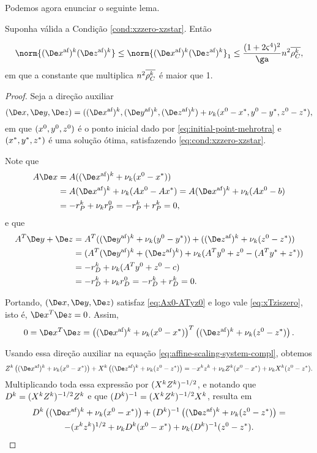 Podemos agora enunciar o seguinte lema.
\begin{lema}\label{lemma:boundDxDzaff}
Suponha válida a Condição  \ref{cond:xzzero-xzstar}. Então 

\begin{equation}
	\label{eq:normDxDzaff}
			\norm{ \dekx  \dekz  } \leq \norm{ \dekx  \dekz  }_{1}  \leq  \frac{(1 + 2\bdxzstar^{4})^{2} }{\ga} n^{2}\rhoCkb,
\end{equation}
em que a constante que multiplica $n^{2}\overline{\rho_C^{k}} $ é maior que \num{1}.
\end{lema}
\begin{proof}
	Seja a direção  auxiliar
	\[
		(\Dex,\Dey,\Dez)  = ( \dekx,  \deky  ,  \dekz  ) + \nuk (\xzero - \xstar,\yzero - \ystar,\zzero - \zstar), 
	\]
em que $(x^0,y^0,z^0)$ é o ponto inicial dado por \eqref{eq:initial-point-mehrotra} e  $(x^*,y^*,z^*)$ é uma  solução ótima, satisfazendo \eqref{eq:cond:xzzero-xzstar}.
	
	Note que 
\[
\begin{aligned}
A\Dex & = A( \dekx + \nuk (\xzero - \xstar)) \\
& =  A\dekx + \nuk (A\xzero - A\xstar)  =  A\dekx + \nuk (A\xzero - b)\\
& = -r_{P}^{k}  + \nuk  r_{P}^{0}   = -r_{P}^{k} + r_{P}^{k} = 0,  
\end{aligned}
\]
e que
\[
\begin{aligned}
A^{T}\Dey + \Dez  & = 	A^{T}(\deky + \nuk (\yzero - \ystar)) + (\dekz + \nuk (\zzero - \zstar)) \\
							& = 	(A^{T}\deky  + \dekz) + \nuk (A^{T}\yzero  + \zzero  - (A^{T}\ystar +  \zstar)) \\
							& = 	- r_{D}^{k} + \nuk (A^{T}\yzero  + \zzero  - c) \\
							& = - r_{D}^{k}  + \nuk  r_{D}^{0}   = -r_{D}^{k} + r_{D}^{k} = 0.   
\end{aligned}
\]


Portando, $(\Dex,\Dey,\Dez)$  satisfaz \eqref{eq:Ax0-ATyz0} e logo vale \eqref{eq:xTziszero}, isto é, $\Dex^{T}\Dez = 0$. Assim, 
	\begin{equation}
		\label{eq:DxDzaff1}
			 0 = \Dex^{T}\Dez = \left( \dekx +  \nuk (\xzero - \xstar)\right)^{T}\left(  \dekz   +  \nuk (\zzero - \zstar)\right).
	\end{equation}
	

	 Usando essa direção auxiliar na equação \eqref{eq:affine-scaling-system-compl}, obtemos 
	 \[
	 \Zk\left( \dekx +  \nuk (\xzero - \xstar)\right)+ \Xk \left(  \dekz   +  \nuk (\zzero - \zstar)\right) = -\xk\zk + \nuk  \Zk(\xzero - \xstar) + \nuk  \Xk(\zzero - \zstar).
	 \]
	 Multiplicando toda essa expressão por $(X^{k}Z^{k})^{-1/2}$, e notando que $D^{k}=(X^{k}Z^{k})^{-1/2}Z^{k}$ e que $(D^{k})^{-1}=(X^{k}Z^{k})^{-1/2}X^{k}$, resulta em 
	\begin{multline}
		\label{eq:DxDzaff2}
		 \Dk\left( \dekx  +  \nuk (\xzero - \xstar)\right)+ \Dik \left(  \dekz   +  \nuk (\zzero - \zstar)\right) = \\ -(\xk\zk)^{1/2} + \nuk  \Dk(\xzero - \xstar) + \nuk  \Dik(\zzero - \zstar).
		\end{multline}
	 

\end{proof}
